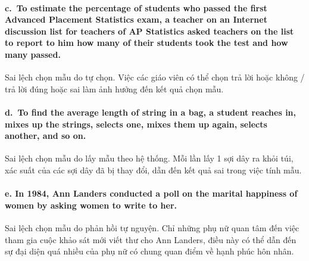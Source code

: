 \documentclass[
]{article}
\begin{document}
\hypertarget{c.-to-estimate-the-percentage-of-students-who-passed-the-first-advanced-placement-statistics-exam-a-teacher-on-an-internet-discussion-list-for-teachers-of-ap-statistics-asked-teachers-on-the-list-to-report-to-him-how-many-of-their-students-took-the-test-and-how-many-passed.}{%
\paragraph{c.~To estimate the percentage of students who passed the
first Advanced Placement Statistics exam, a teacher on an Internet
discussion list for teachers of AP Statistics asked teachers on the list
to report to him how many of their students took the test and how many
passed.}\label{c.-to-estimate-the-percentage-of-students-who-passed-the-first-advanced-placement-statistics-exam-a-teacher-on-an-internet-discussion-list-for-teachers-of-ap-statistics-asked-teachers-on-the-list-to-report-to-him-how-many-of-their-students-took-the-test-and-how-many-passed.}}

Sai lệch chọn mẫu do tự chọn. Việc các giáo viên có thể chọn trả lời
hoặc không / trả lời đúng hoặc sai làm ảnh hưởng đến kết quả chọn mẫu.

\hypertarget{d.-to-find-the-average-length-of-string-in-a-bag-a-student-reaches-in-mixes-up-the-strings-selects-one-mixes-them-up-again-selects-another-and-so-on.}{%
\paragraph{d.~To find the average length of string in a bag, a student
reaches in, mixes up the strings, selects one, mixes them up again,
selects another, and so
on.}\label{d.-to-find-the-average-length-of-string-in-a-bag-a-student-reaches-in-mixes-up-the-strings-selects-one-mixes-them-up-again-selects-another-and-so-on.}}

Sai lệch chọn mẫu do lấy mẫu theo hệ thống. Mỗi lần lấy 1 sợi dây ra
khỏi túi, xác suất của các sợi dây đã bị thay đổi, dẫn đến kết quả sai
trong việc tính mẫu.

\hypertarget{e.-in-1984-ann-landers-conducted-a-poll-on-the-marital-happiness-of-women-by-asking-women-to-write-to-her.}{%
\paragraph{e. In 1984, Ann Landers conducted a poll on the marital
happiness of women by asking women to write to
her.}\label{e.-in-1984-ann-landers-conducted-a-poll-on-the-marital-happiness-of-women-by-asking-women-to-write-to-her.}}

Sai lệch chọn mẫu do phản hồi tự nguyện. Chỉ những phụ nữ quan tâm đến
việc tham gia cuộc khảo sát mới viết thư cho Ann Landers, điều này có
thể dẫn đến sự đại diện quá nhiều của phụ nữ có chung quan điểm về hạnh
phúc hôn nhân.
\end{document}
